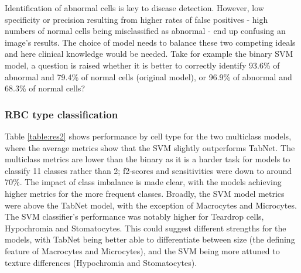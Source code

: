 \documentclass[final,5p,times,twocolumn,authoryear]{elsarticle}
\begin{document}
Identification of abnormal cells is key to disease detection. However, low specificity or precision resulting from higher rates of false positives - high numbers of normal cells being misclassified as abnormal - end up confusing an image's results. The choice of model needs to balance these two competing ideals and here clinical knowledge would be needed. 
Take for example the binary SVM model, a question is raised whether it is better to correctly identify 93.6\% of abnormal and 79.4\% of normal cells (original model), or 96.9\% of abnormal and 68.3\% of normal cells?


\subsubsection{RBC type classification}
\label{sec:multi}

Table \ref{table:res2} shows performance by cell type for the two multiclass models, where the average metrics show that the SVM  slightly outperforms TabNet. The multiclass metrics are lower than the binary as it is a harder task for models to classify 11 classes rather than 2; f2-scores and sensitivities were down to around 70\%. The impact of class imbalance is made clear, with the models achieving higher metrics for the more frequent classes. Broadly, the SVM model metrics were above the TabNet model, with the exception of Macrocytes and Microcytes. The SVM classifier's performance was notably higher for Teardrop cells, Hypochromia and Stomatocytes. This could suggest different strengths for the models, with TabNet being better able to differentiate between size (the defining feature of Macrocytes and Microcytes), and the SVM being more attuned to texture differences (Hypochromia and Stomatocytes). 
\end{document}
